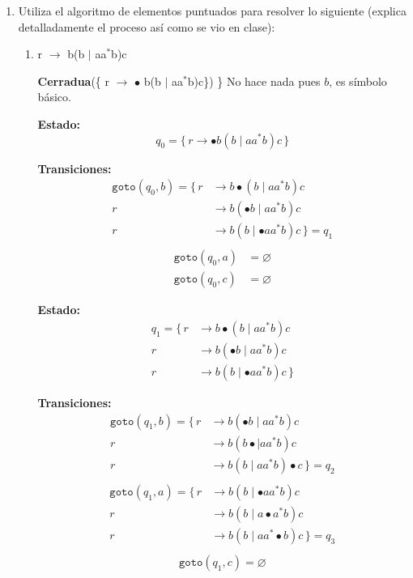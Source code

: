\documentclass[12pt,letterpaper]{article}
\begin{document}
\begin{enumerate}[label=\arabic*.]

\item Utiliza el algoritmo de elementos puntuados para resolver lo siguiente (explica detalladamente el proceso
  así como se vio en clase):

\begin{enumerate}[label=\alph*.]

\item r $\to$ b(b $\mid$ aa$^*$b)c

  \textbf{Cerradua}\big(\{ r $\to$ $\bullet$ b(b $\mid$ aa$^*$b)c\}\big) \big\} No hace nada pues $b$, es símbolo
  básico.

  \medskip

  \textbf{Estado:}
  \[
  q_0 = \{\, r \to \bullet b(b \mid aa^*b)c \,\}
  \]

  \textbf{Transiciones:}
  \[
  \begin{aligned}
    \texttt{goto}(q_0, b) =
    \{\,
    r &\to b\bullet(b \mid aa^*b)c \\
    r &\to b(\bullet b \mid aa^*b)c \\
    r &\to b(b \mid \bullet aa^*b)c
    \,\} = q_1 \\
  \end{aligned}
  \]
  \[
  \begin{aligned}
    \texttt{goto}(q_0, a) &= \varnothing\\
    \texttt{goto}(q_0, c) &= \varnothing
  \end{aligned}
  \]

  \medskip
  
  \textbf{Estado:}
  \[
  \begin{aligned}
    q_1 =
    \{\,
    r &\to b\bullet(b \mid aa^*b)c \\
    r &\to b(\bullet b \mid aa^*b)c \\
    r &\to b(b \mid \bullet aa^*b)c
    \,\}
  \end{aligned}
  \]

  \textbf{Transiciones:}
  \[
  \begin{aligned}
    \texttt{goto}(q_1, b) =
    \{\,
    r &\to b(\bullet b \mid aa^*b)c \\
    r &\to b(b \bullet \mid aa^*b)c \\
    r &\to b(b \mid aa^*b)\bullet c
    \,\} = q_2\\
  \end{aligned}
  \]
  \[
  \begin{aligned}
    \texttt{goto}(q_1, a) =
    \{\,
    r &\to b (b \mid \bullet aa^*b)c \\
    r &\to b (b \mid a \bullet a^*b)c \\
    r &\to b (b \mid aa^* \bullet b)c
    \,\} = q_3 \\
  \end{aligned}
  \]
  \[
  \begin{aligned}
    \texttt{goto}(q_1, c) = \varnothing
  \end{aligned}
  \]


\end{enumerate}
\end{enumerate}
\end{document}
